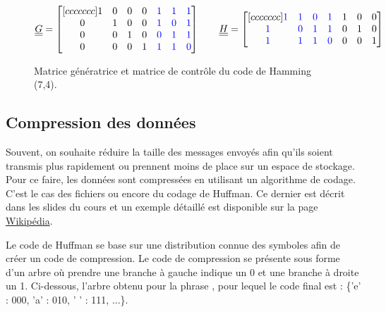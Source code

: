 \documentclass [a4paper, 11pt] {article}
\begin{document}
    \begin{figure}[H]
        \centering
        \begin{equation*}
            \underline{\underline{G}} =
            \begin{bmatrix}[ccccccc]
               1 & 0 & 0 & 0 & \color{blue} 1 & \color{blue} 1 & \color{blue} 1 \\
               0 & 1 & 0 & 0 & \color{blue} 1 & \color{blue} 0 & \color{blue} 1 \\
               0 & 0 & 1 & 0 & \color{blue} 0 & \color{blue} 1 & \color{blue} 1 \\
               0 & 0 & 0 & 1 & \color{blue} 1 & \color{blue} 1 & \color{blue} 0 \\
            \end{bmatrix}
            \hspace{.7cm}
            \underline{\underline{H}} =
            \begin{bmatrix}[ccccccc]
               \color{blue} 1 & \color{blue} 1 & \color{blue} 0 & \color{blue} 1 & 1 & 0 & 0 \\
               \color{blue} 1 & \color{blue} 0 & \color{blue} 1 & \color{blue} 1 & 0 & 1 & 0 \\
               \color{blue} 1 & \color{blue} 1 & \color{blue} 1 & \color{blue} 0 & 0 & 0 & 1 \\
            \end{bmatrix}
        \end{equation*}
        \caption{Matrice génératrice et matrice de contrôle du code de Hamming (7,4).}
        \label{fig:generatrice_encodage_hamming_7_4}
    \end{figure}
    
    \subsection*{Compression des données}
    
    Souvent, on souhaite réduire la taille des messages envoyés afin qu'ils soient transmis plus rapidement ou prennent moins de place sur un espace de stockage. Pour ce faire, les données sont compressées en utilisant un algorithme de codage. C'est le cas des fichiers  ou encore du codage de Huffman. Ce dernier est décrit dans les slides du cours et un exemple détaillé est disponible sur la page \href{https://fr.wikipedia.org/wiki/Codage_de_Huffman#Principe}{Wikipédia}.
    
    Le code de Huffman se base sur une distribution connue des symboles afin de créer un code de compression. Le code de compression se présente sous forme d'un arbre où prendre une branche à gauche indique un 0 et une branche à droite un 1. Ci-dessous, l'arbre obtenu pour la phrase , pour lequel le code final est : \{'e' : 000, 'a' : 010, ' ' : 111, ...\}.
    
\end{document}
